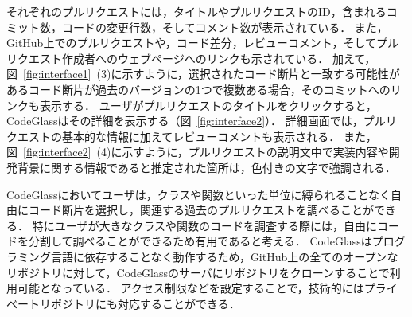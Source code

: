 それぞれのプルリクエストには，タイトルやプルリクエストのID，含まれるコミット数，コードの変更行数，そしてコメント数が表示されている．
また，GitHub上でのプルリクエストや，コード差分，レビューコメント，そしてプルリクエスト作成者へのウェブページへのリンクも示されている．
加えて，図~\ref{fig:interface1}~(3)に示すように，選択されたコード断片と一致する可能性があるコード断片が過去のバージョンの1つで複数ある場合，そのコミットへのリンクも表示する．
ユーザがプルリクエストのタイトルをクリックすると，CodeGlassはその詳細を表示する（図~\ref{fig:interface2}）．
詳細画面では，プルリクエストの基本的な情報に加えてレビューコメントも表示される．
また，図~\ref{fig:interface2}~(4)に示すように，プルリクエストの説明文中で実装内容や開発背景に関する情報であると推定された箇所は，色付きの文字で強調される．


CodeGlassにおいてユーザは，クラスや関数といった単位に縛られることなく自由にコード断片を選択し，関連する過去のプルリクエストを調べることができる．
特にユーザが大きなクラスや関数のコードを調査する際には，自由にコードを分割して調べることができるため有用であると考える．
CodeGlassはプログラミング言語に依存することなく動作するため，GitHub上の全てのオープンなリポジトリに対して，CodeGlassのサーバにリポジトリをクローンすることで利用可能となっている．
アクセス制限などを設定することで，技術的にはプライベートリポジトリにも対応することができる．


